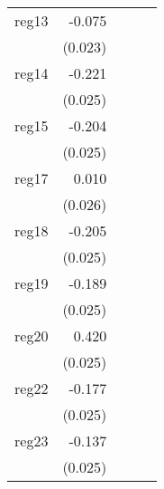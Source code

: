{\begin{longtable}{l*{4}{D{.}{.}{-1}}}
\addlinespace
reg13       &      -0.075\sym{**} &                     &                     &                     \\
            &     (0.023)         &                     &                     &                     \\
\addlinespace
reg14       &      -0.221\sym{***}&                     &                     &                     \\
            &     (0.025)         &                     &                     &                     \\
\addlinespace
reg15       &      -0.204\sym{***}&                     &                     &                     \\
            &     (0.025)         &                     &                     &                     \\
\addlinespace
reg17       &       0.010         &                     &                     &                     \\
            &     (0.026)         &                     &                     &                     \\
\addlinespace
reg18       &      -0.205\sym{***}&                     &                     &                     \\
            &     (0.025)         &                     &                     &                     \\
\addlinespace
reg19       &      -0.189\sym{***}&                     &                     &                     \\
            &     (0.025)         &                     &                     &                     \\
\addlinespace
reg20       &       0.420\sym{***}&                     &                     &                     \\
            &     (0.025)         &                     &                     &                     \\
\addlinespace
reg22       &      -0.177\sym{***}&                     &                     &                     \\
            &     (0.025)         &                     &                     &                     \\
\addlinespace
reg23       &      -0.137\sym{***}&                     &                     &                     \\
            &     (0.025)         &                     &                     &                     \\

\end{longtable}}
